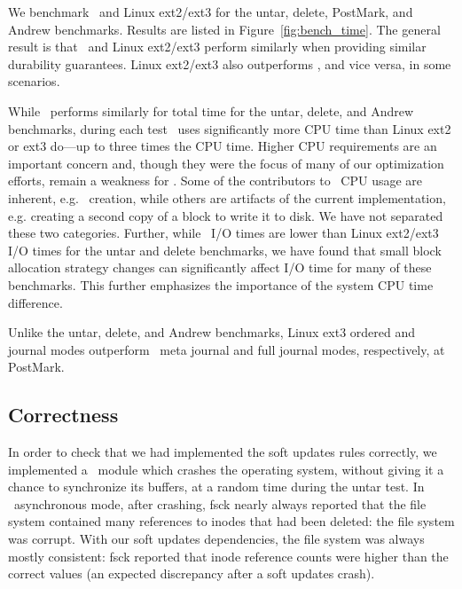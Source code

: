 We benchmark \Kudos\ and Linux ext2/ext3 for the untar, delete,
PostMark, and Andrew benchmarks. Results are listed in
Figure~\ref{fig:bench_time}.
%
The general result is that \Kudos\ and Linux ext2/ext3 perform
similarly when providing similar durability guarantees. Linux
ext2/ext3 also outperforms \Kudos, and vice versa, in some scenarios.

\benchtable{}

While \Kudos\ performs similarly for total time for the untar, delete,
and Andrew benchmarks, during each test \Kudos\ uses significantly
more CPU time than Linux ext2 or ext3 do---up to three times the CPU
time.
%
Higher CPU requirements are an important concern and, though they were
the focus of many of our optimization efforts, remain a weakness
for \Kudos.
%
Some of the contributors to \Kudos\ CPU usage are inherent, e.g.
\patch\ creation, while others are artifacts of the current
implementation, e.g.  creating a second copy of a block to write it to
disk. We have not separated these two categories.
%
Further, while \Kudos\ I/O times are lower than Linux ext2/ext3 I/O
times for the untar and delete benchmarks, we have found that small
block allocation strategy changes can significantly affect I/O time
for many of these benchmarks. This further emphasizes the importance
of the system CPU time difference.

Unlike the untar, delete, and Andrew benchmarks, Linux ext3 ordered
and journal modes outperform \Kudos\ meta journal and full journal
modes, respectively, at PostMark.


\subsection {Correctness}
\label{sec:eval:correctness}

In order to check that we had implemented the soft updates rules correctly, we
implemented a \Kudos\ module which crashes the operating system, without
giving it a chance to synchronize its buffers, at a random time during the
untar test.
%
In \Kudos\ asynchronous mode, after crashing, fsck nearly always reported that
the file system contained many references to inodes that had been deleted: the
file system was corrupt.
%
With our soft updates dependencies, the file system was always mostly
consistent: fsck reported that inode reference counts were higher than the
correct values (an expected discrepancy after a soft updates crash).

